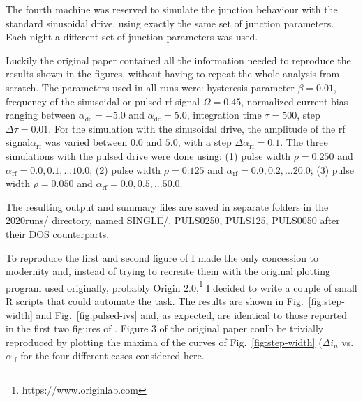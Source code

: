 The fourth machine was reserved to simulate the junction behaviour with the standard sinusoidal drive, using exactly the same set of junction parameters.
Each night a different set of junction parameters was used.

Luckily the original paper  contained all the information needed to reproduce the results shown in the figures, without having to repeat the whole analysis from scratch. The parameters used in all runs were: hysteresis parameter $\beta = 0.01$, frequency of the sinusoidal or pulsed  rf signal $\Omega = 0.45$, normalized current bias ranging between $\alpha_\mathrm{dc} = -5.0$ and $\alpha_\mathrm{dc} = 5.0$, integration time $\tau = 500$, step $\Delta \tau = 0.01$. For the simulation with the sinusoidal drive, 
the amplitude of the rf signal$\alpha_\mathrm{rf}$ was varied between $0.0$ and $5.0$, with a step $\Delta \alpha_\mathrm{rf} = 0.1$. 
The three simulations with the pulsed drive were done using: 
(1) pulse width $\rho = 0.250$ and $\alpha_\mathrm{rf} = 0.0, 0.1, ... 10.0$;
(2) pulse width $\rho = 0.125$ and $\alpha_\mathrm{rf} = 0.0, 0.2, ... 20.0$;
(3) pulse width $\rho = 0.050$ and $\alpha_\mathrm{rf} = 0.0, 0.5, ... 50.0$.

The resulting output and summary files are saved in separate folders in the \textsf{2020runs/} directory, named \textsf{SINGLE/}, \textsf{PULS0250}, \textsf{PULS125}, \textsf{PULS0050} after their DOS counterparts.

To reproduce the first and second figure of \cite{Maggi:1996} I made the only concession to modernity and, instead of trying to recreate them with the original plotting program used originally, probably \textsf{Origin 2.0},\footnote{https://www.originlab.com} I decided to write a couple of small R scripts that could automate the task.
The results are shown in Fig.~\ref{fig:step-width} and Fig.~\ref{fig:pulsed-ivs} and, as expected, are identical to those reported in the first two figures of \cite{Maggi:1996}. Figure 3 of the original paper coulb be trivially reproduced by plotting the maxima of the curves of Fig.~\ref{fig:step-width} ($\Delta i_n$ vs. $\alpha_\mathrm{rf}$ for the four different cases considered here.


